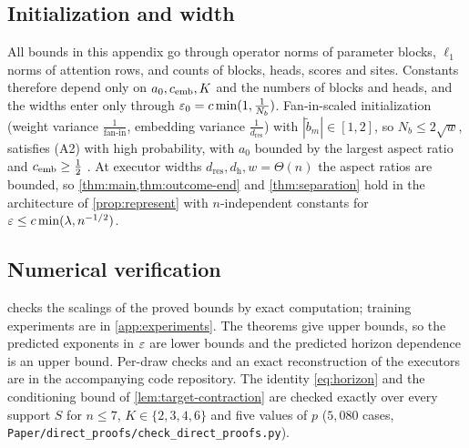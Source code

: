 \subsection{Initialization and width}
\label{rem:end-width}
All bounds in this appendix go through operator norms of parameter blocks, $\ell_1$ norms of attention rows, and counts of blocks,
heads, scores and sites. Constants therefore depend only on $a_0,c_{\mathrm{emb}},K$ and the numbers of blocks and heads, and the widths enter only
through $\varepsilon_0=c\min(1,\frac{1}{N_b})$. Fan-in-scaled initialization (weight variance $\frac{1}{\text{fan-in}}$, embedding variance $\frac{1}{d_{\mathrm{res}}}$) with
$|\tilde b_m|\in[1,2]$, so $N_b\le2\sqrt w$, satisfies (A2) with high probability, with $a_0$ bounded by the largest aspect ratio and $c_{\mathrm{emb}}\ge\frac{1}{2}$
\citep[Thms.~4.4.5, 4.6.1]{vershynin2018high}. At executor widths $d_{\mathrm{res}},d_{\mathrm h},w=\Theta(n)$ the aspect ratios are bounded, so
\cref{thm:main,thm:outcome-end} and \cref{thm:separation} hold in the architecture of \cref{prop:represent} with $n$-independent constants for
$\varepsilon\le c\min(\lambda,n^{-1/2})$.


\subsection{Numerical verification}
\label{app:verify}
 checks the scalings of the proved bounds by exact computation; training experiments are in \cref{app:experiments}. The
theorems give upper bounds, so the predicted exponents in $\varepsilon$ are lower bounds and the predicted horizon dependence is an upper
bound. Per-draw checks and an exact reconstruction of the executors are in the accompanying code repository. The identity
\cref{eq:horizon} and the conditioning bound of \cref{lem:target-contraction} are checked exactly over every support $S$ for $n\le7$,
$K\in\{2,3,4,6\}$ and five values of $p$ ($5{,}080$ cases, \texttt{Paper/direct\_proofs/check\_direct\_proofs.py}).

